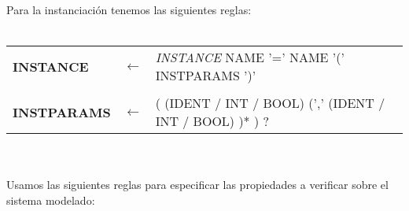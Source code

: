\documentclass[titlepage, 12pt]{book}
\begin{document}


Para la instanciaci\'on tenemos las siguientes reglas:\\\\

\noindent\begin{longtable}{>{\bfseries}lll}
INSTANCE & $\longleftarrow$ & \textit{INSTANCE} NAME '=' NAME '(' INSTPARAMS ')'\\\\
INSTPARAMS & $\longleftarrow$ & ( (IDENT / INT / BOOL) (',' (IDENT / INT / BOOL) )* ) ?
\end{longtable}
~\\\\





Usamos las siguientes reglas para especificar las propiedades a verificar sobre el sistema modelado:\\\\
\end{document}
